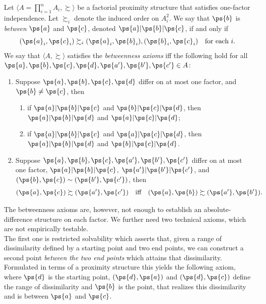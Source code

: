 \begin{ax} \label{def-between-ax}
Let $\langle A = \prod_{i=1}^n A_i, \succsim \rangle$ be a factorial proximity structure that satisfies one-factor independence. Let $\succsim_i$ denote the induced order on $A^2_i$. We say that $\ps{b}$ is \emph{between} $\ps{a}$ and $\ps{c}$, denoted $\ps{a}|\ps{b}|\ps{c}$, if and only if
\[
  (\ps{a}_i, \ps{c}_i) \succsim_i (\ps{a}_i, \ps{b}_i), (\ps{b}_i, \ps{c}_i) \quad \text{for each } i.
\]
We say that $\langle A, \succsim \rangle$ satisfies the \emph{betweenness axioms} iff the following hold for all $\ps{a}, \ps{b}, \ps{c}, \ps{d}, \ps{a'}, \ps{b'}, \ps{c'} \in A$:

\begin{enumerate}
    \item Suppose $\ps{a}, \ps{b}, \ps{c}, \ps{d}$ differ on at most one factor, and $\ps{b} \neq \ps{c}$, then
    \begin{enumerate}
        \item[(i)] if $\ps{a}|\ps{b}|\ps{c}$ and $\ps{b}|\ps{c}|\ps{d}$, then $\ps{a}|\ps{b}|\ps{d}$ and $\ps{a}|\ps{c}|\ps{d}$;
        \item[(ii)] if $\ps{a}|\ps{b}|\ps{c}$ and $\ps{a}|\ps{c}|\ps{d}$, then $\ps{a}|\ps{b}|\ps{d}$ and $\ps{b}|\ps{c}|\ps{d}$.
    \end{enumerate}
    \item Suppose $\ps{a}, \ps{b}, \ps{c}, \ps{a'}, \ps{b'}, \ps{c'}$ differ on at most one factor, $\ps{a}|\ps{b}|\ps{c}$, $\ps{a'}|\ps{b'}|\ps{c'}$, and $(\ps{b}, \ps{c}) \sim (\ps{b'}, \ps{c'})$, then
    \[
    (\ps{a}, \ps{c}) \succsim (\ps{a'}, \ps{c'}) \quad  \text{iff} \quad  (\ps{a}, \ps{b}) \succsim (\ps{a'}, \ps{b'}).
    \]
\end{enumerate}
\end{ax}

The betweenness axioms are, however, not enough to establish an absolute-difference structure on each factor. We further need two technical axioms, which are not empirically testable.\\
The first one is restricted solvability which asserts that, given a range of dissimilarity defined by a starting point and two end points, we can construct a second point \emph{between the two end points} which attains that dissimilarity.
Formulated in terms of a proximity structure this yields the following axiom, where $\ps{d}$ is the starting point, $(\ps{d}, \ps{a})$ and $(\ps{d}, \ps{c})$ define the range of dissimilarity and $\ps{b}$ is the point, that realizes this dissimilarity and is between $\ps{a}$ and $\ps{c}$.

